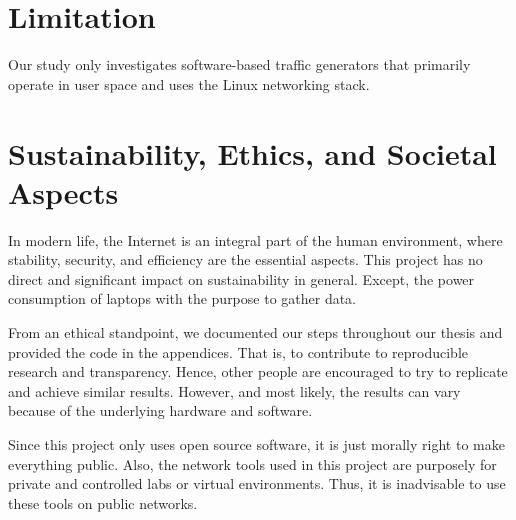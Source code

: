\section{Limitation}
Our study only investigates software-based traffic generators that primarily operate in user space and uses the Linux networking stack.

%
%
\section{Sustainability, Ethics, and Societal Aspects}
In modern life, the Internet is an integral part of the human environment, where stability, security, and efficiency are the essential aspects.
This project has no direct and significant impact on sustainability in general.
Except, the power consumption of laptops with the purpose to gather data.


\skippara From an ethical standpoint, we documented our steps throughout our thesis and provided the code in the appendices.
That is, to contribute to reproducible research and transparency.
Hence, other people are encouraged to try to replicate and achieve similar results.
However, and most likely, the results can vary because of the underlying hardware and software.

\skippara Since this project only uses open source software, it is just morally right to make everything public.
Also, the network tools used in this project are purposely for private and controlled labs or virtual environments.
Thus, it is inadvisable to use these tools on public networks.
